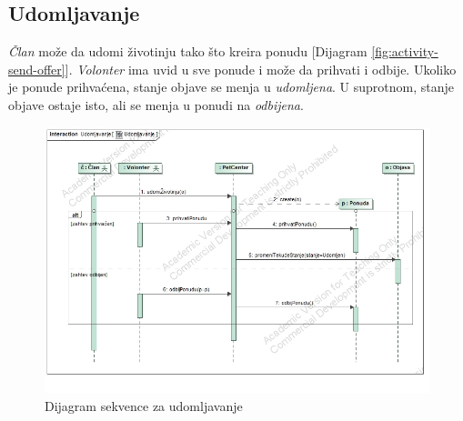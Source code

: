 \subsection{Udomljavanje}
\par \textit{Član} može da udomi životinju tako što kreira ponudu [Dijagram \ref{fig:activity-send-offer}]. \textit{Volonter} ima uvid u sve ponude i može da
prihvati i odbije. Ukoliko je ponude prihvaćena, stanje objave se menja u \textit{udomljena}. U suprotnom, stanje objave ostaje isto, ali se menja u 
ponudi na \textit{odbijena}.
\begin{figure}[ht]
    \centering
    \includegraphics[width=\textwidth, height=\textwidth]{img/adoption.jpg}
    \caption{Dijagram sekvence za udomljavanje}
    \label{fig:adoption-seq}
\end{figure}